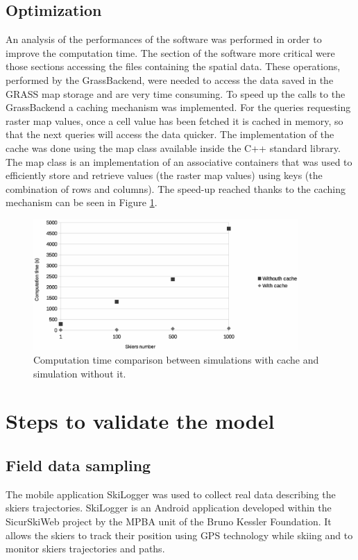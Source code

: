\documentclass[12pt,a4paper,twoside]{book}
\begin{document}
\section{Optimization}
An analysis of the performances of the software was performed in order to improve the computation time. The section of the software more critical were those sections accessing the files containing the spatial data. These operations, performed by the GrassBackend, were needed to access the data saved in the GRASS map storage and are very time consuming. To speed up the calls to the GrassBackend a caching mechanism was implemented. For the queries requesting raster map values, once a cell value has been fetched it is cached in memory, so that the next queries will access the data quicker. The implementation of the cache was done using the map class available inside the C++ standard library. The map class is an implementation of an associative containers that was used to efficiently store and retrieve values (the raster map values) using keys (the combination of rows and columns). The speed-up reached thanks to the caching mechanism can be seen in Figure \ref{speed-up_cache}.

\begin{figure}[!h]
  \begin{center}
    \includegraphics[width=0.9\textwidth]{images/caching.eps}
    \caption{Computation time comparison between simulations with cache and simulation without it.}\label{speed-up_cache}
  \end{center}
\end{figure}

\chapter{Steps to validate the model}\label{steps_validate}
\section{Field data sampling}
The mobile application SkiLogger was used to collect real data describing the skiers trajectories. SkiLogger is an Android application developed within the SicurSkiWeb project by the MPBA unit of the Bruno Kessler Foundation. It allows the skiers to track their position using GPS technology while skiing and to monitor skiers trajectories and paths.
\end{document}

